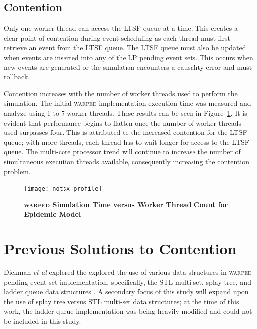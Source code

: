 \documentclass[11pt]{book}
\begin{document}
\subsection{Contention}

Only one worker thread can access the LTSF queue at a time.  This creates a clear point of
contention during event scheduling as each thread must first retrieve an event from the
LTSF queue.  The LTSF queue must also be updated when events are inserted into any of the
LP pending event sets.  This occurs when new events are generated or the simulation
encounters a causality error and must rollback.

Contention increases with the number of worker threads used to perform the simulation.
The initial \textsc{warped} implementation execution time was measured and analyze using 1
to 7 worker threads.  These results can be seen in Figure~\ref{fig:notsx_profile}.  It is
evident that performance begins to flatten once the number of worker threads used
surpasses four.  This is attributed to the increased contention for the LTSF queue; with
more threads, each thread has to wait longer for access to the LTSF queue.  The multi-core
processor trend will continue to increase the number of simultaneous execution threads
available, consequently increasing the contention problem.

\begin{figure}
    \centering
    \graphicspath{ {./figures/} }
    \texttt{[image: notsx\_profile]}
    \caption{\textbf{\textsc{warped} Simulation Time versus Worker Thread Count for
        Epidemic Model}}\label{fig:notsx_profile}
\end{figure}

\section{Previous Solutions to Contention}

Dickman \emph{et al} explored the explored the use of various data structures in
\textsc{warped} pending event set implementation, specifically, the STL multi-set, splay
tree, and ladder queue data structures \cite{dickman}.  A secondary focus of this study
will expand upon the use of splay tree versus STL multi-set data structures; at the time
of this work, the ladder queue implementation was being heavily modified and could not be
included in this study.
\end{document}
